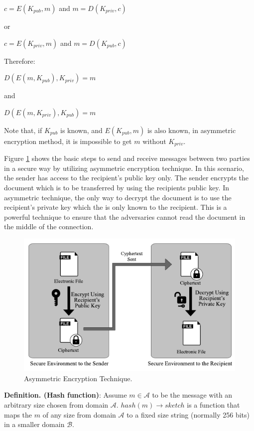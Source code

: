 \begin{center}
	$c = E(K_{pub},m)$ and  $m = D(K_{priv},c)$
\end{center}
or
\begin{center}
	$c = E(K_{priv},m)$ and  $m = D(K_{pub},c)$
\end{center}
Therefore:
\begin{center}
	$D(E(m,K_{pub}),K_{priv}) = m$ 
\end{center}
and
\begin{center}
	$D(E(m,K_{priv}),K_{pub}) = m$
\end{center}
Note that, if $K_{pub}$ is known, and $E(K_{pub},m)$ is also known, in asymmetric encryption method, it is impossible to get $m$ without $K_{priv}$.

Figure \ref{fig:AssymmetricEncryption} shows the basic steps to send and receive messages between two parties in a secure way by utilizing asymmetric encryption technique. In this scenario, the sender has access to the recipient's public key only. The sender encrypts the document which is to be transferred by using the recipients public key. In asymmetric technique, the only way to decrypt the document is to use the recipient's private key which the is only known to the recipient. This is a powerful technique to ensure that the adversaries cannot read the document in the middle of the connection.

\begin{figure}
	\label{fig:AssymmetricEncryption}
	\centering
	\includegraphics[width=\textwidth]{figs/asymmetricEncryption.pdf}
	\caption{Asymmetric Encryption Technique.}
\end{figure}
\textbf{Definition. (Hash function)}: Assume $m \in \mathcal{A}$ to be the message with an arbitrary size chosen from domain $\mathcal{A}$. $hash(m)\rightarrow sketch$ 
is a function that maps the $m$ of any size from domain $\mathcal{A}$ to a fixed size string (normally 256 bits) in a smaller domain $\mathcal{B}$.

